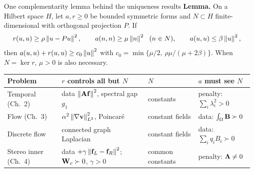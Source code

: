 \begin{frame}[label=complementarity]{One complementarity lemma behind the uniqueness results}
\small
\textbf{Lemma.} On a Hilbert space $H$, let $a,r\ge0$ be bounded symmetric forms and $N\subset H$ finite-dimensional with orthogonal projection $P$. If
\[r(u,u)\ge\rho\left\lVert u-Pu\right\rVert^2,\qquad a(n,n)\ge\mu\left\lVert n\right\rVert^2\ \ (n\in N),\qquad a(u,u)\le\beta\left\lVert u\right\rVert^2,\]
then $a(u,u)+r(u,u)\ge c_0\left\lVert u\right\rVert^2$ with $c_0=\min\{\mu/2,\ \rho\mu/(\mu+2\beta)\}$. When $N=\ker r$, $\mu>0$ is also necessary.
\par\smallskip
{\scriptsize\renewcommand{\arraystretch}{1.05}\begin{tabular}{@{}llll@{}}\toprule
Problem & $r$ controls all but $N$ & $N$ & $a$ must see $N$\\\midrule
Temporal (Ch.~2) & data $\left\lVert\mathbf A\mathbf f\right\rVert^2$, spectral gap $g_1$ & constants & penalty: $\sum_i\lambda_i^2>0$\\
Flow (Ch.~3) & $\alpha^2\left\lVert\nabla\mathbf v\right\rVert_{L^2}^2$, Poincar\'e & constant fields & data: $\int_\Omega\mathbf B\succ0$\\
Discrete flow & connected graph Laplacian & constant fields & data: $\sum_iq_iB_i\succ0$\\
Stereo inner (Ch.~4) & data $+\gamma\left\lVert\mathbf f_L-\mathbf f_R\right\rVert^2$; $\mathbf W_c\succ0$, $\gamma>0$ & common constants & penalty: $\bm\Lambda\ne0$\\\bottomrule
\end{tabular}\par}

\end{frame}
